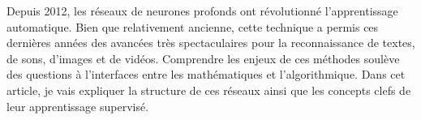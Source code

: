 Depuis 2012, les réseaux de neurones profonds ont révolutionné l'apprentissage automatique. 
%
Bien que relativement ancienne, cette technique a permis ces dernières années des avancées très spectaculaires pour la reconnaissance de textes, de sons, d'images et de vidéos. 
%
Comprendre les enjeux de ces méthodes soulève des questions à l'interfaces entre les mathématiques et l'algorithmique.
%
Dans cet article, je vais expliquer la structure de ces réseaux ainsi que les concepts clefs de leur apprentissage supervisé. 
